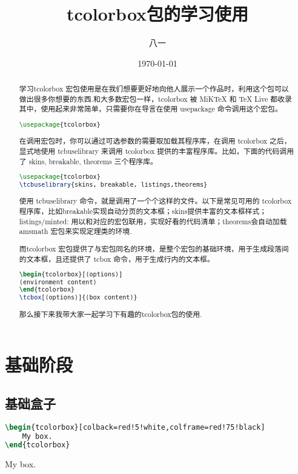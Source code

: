 \documentclass{ctexart}
\title{tcolorbox包的学习使用}
\author{八一}
\date{\today}
\begin{document}
\maketitle
\begin{abstract}
	学习tcolorbox 宏包使用是在我们想要更好地向他人展示一个作品时，利用这个包可以做出很多你想要的东西.和大多数宏包一样，tcolorbox 被 MiKTeX 和 TeX Live 都收录其中，使用起来非常简单，只需要你在导言在使用 usepackage 命令调用这个宏包。
\begin{lstlisting}[language={TeX}]
\usepackage{tcolorbox}
\end{lstlisting}

在调用宏包时，你可以通过可选参数的需要取加载其程序库，在调用 tcolorbox 之后，显式地使用 tcbuselibrary 来调用 tcolorbox 提供的丰富程序库。比如，下面的代码调用了 skins, breakable, theorems 三个程序库。
\begin{lstlisting}[language={TeX}]
\usepackage{tcolorbox}
\tcbuselibrary{skins, breakable, listings,theorems}
\end{lstlisting}

使用 tcbuselibrary 命令，就是调用了一个个这样的文件。以下是常见可用的 tcolorbox 程序库，比如breakable实现自动分页的文本框；skins提供丰富的文本框样式；listings/minted: 用以和对应的宏包联用，实现好看的代码清单；theorems会自动加载 amsmath 宏包来实现定理类的环境.

而tcolorbox 宏包提供了与宏包同名的环境，是整个宏包的基础环境，用于生成段落间的文本框，且还提供了 tcbox 命令，用于生成行内的文本框。
\begin{lstlisting}[language={TeX}]
\begin{tcolorbox}[⟨options⟩]
⟨environment content⟩
\end{tcolorbox}
\tcbox[⟨options⟩]{⟨box content⟩}
\end{lstlisting}

那么接下来我带大家一起学习下有趣的tcolorbox包的使用.
\end{abstract}
\section{基础阶段}	
\subsection{基础盒子}
\begin{lstlisting}[language={TeX}]
\begin{tcolorbox}[colback=red!5!white,colframe=red!75!black]
	My box.
\end{tcolorbox}
\end{lstlisting}
	\begin{tcolorbox}[colback=red!5!white,colframe=red!75!black]
		My box.
	\end{tcolorbox}
\end{document}
